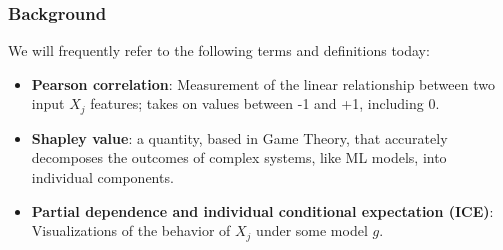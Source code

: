 \documentclass[11pt,aspectratio=169,hyperref={colorlinks}]{beamer}
\begin{document}
		\begin{frame}
		
			\frametitle{Background}		
			
			We will frequently refer to the following terms and definitions today: \\			
			
			\begin{itemize}
				\item{\textbf{Pearson correlation}: Measurement of the linear relationship between two input $X_j$ features; takes on values between -1 and +1, including 0.}
				\item{\textbf{Shapley value}: a quantity, based in Game Theory, that accurately decomposes the outcomes of complex systems, like ML models, into individual components.}
				\item{\textbf{Partial dependence and individual conditional expectation (ICE)}: Visualizations of the behavior of $X_j$ under some model $g$.}
			\end{itemize}			
		
		\end{frame}
\end{document}

